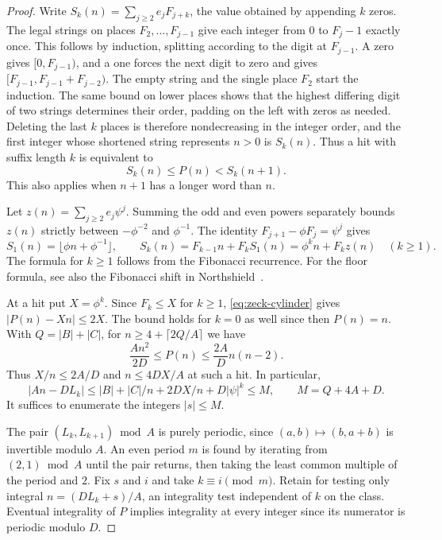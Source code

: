 \documentclass[11pt,reqno,a4paper]{amsart}
\theoremstyle{remark}
\begin{document}
\begin{proof}
Write \(S_k(n)=\sum_{j\ge2}e_j F_{j+k}\), the value obtained by
appending \(k\) zeros. The legal strings on places \(F_2,\ldots,F_{j-1}\)
give each integer from \(0\) to \(F_j-1\) exactly once. This follows
by induction, splitting according to the digit at \(F_{j-1}\).
A zero gives \([0,F_{j-1})\), and a one forces the next digit to
zero and gives \([F_{j-1},F_{j-1}+F_{j-2})\). The empty string and
the single place \(F_2\) start the induction. The same bound on
lower places shows that the highest differing digit of two strings
determines their order, padding on the left with zeros as needed.
Deleting the last \(k\) places is therefore nondecreasing in the
integer order, and the first integer whose shortened string represents
\(n>0\) is \(S_k(n)\). Thus a hit with suffix length \(k\) is equivalent to
\begin{equation}\label{eq:zeck-cylinder}
 S_k(n)\le P(n)<S_k(n+1).
\end{equation}
This also applies when \(n+1\) has a longer word than \(n\).

Let \(z(n)=\sum_{j\ge2}e_j\psi^j\). Summing the odd and even powers
separately bounds \(z(n)\) strictly between \(-\phi^{-2}\) and
\(\phi^{-1}\). The identity \(F_{j+1}-\phi F_j=\psi^j\) gives
\begin{equation}\label{eq:zeck-shift}
 S_1(n)=\lfloor\phi n+\phi^{-1}\rfloor,\qquad
 S_k(n)=F_{k-1}n+F_k S_1(n)=\phi^k n+F_k z(n)
 \quad(k\ge1).
\end{equation}
The formula for \(k\ge1\) follows from the Fibonacci recurrence.
For the floor formula, see also the Fibonacci shift
in Northshield~\cite[\S6]{zec-northshield}.

At a hit put \(X=\phi^k\). Since \(F_k\le X\) for \(k\ge1\),
\eqref{eq:zeck-cylinder} gives \(\lvert P(n)-Xn\rvert\le2X\).
The bound holds for \(k=0\) as well since then \(P(n)=n\).
With \(Q=|B|+|C|\), for \(n\ge 4+\lceil 2Q/A\rceil\) we have
\[
 \frac{A n^2}{2D}\le P(n)\le\frac{2A}{D}n(n-2).
\]
Thus \(X/n\le2A/D\) and \(n\le4DX/A\) at such a hit. In particular,
\[
 |An-DL_k|\le |B|+|C|/n+2DX/n+D|\psi|^k
 \le M,\qquad M=Q+4A+D.
\]
It suffices to enumerate the integers \(|s|\le M\).

The pair \((L_k,L_{k+1})\bmod A\) is purely periodic, since
\((a,b)\mapsto(b,a+b)\) is invertible modulo \(A\). An even period
\(m\) is found by iterating from \((2,1)\bmod A\) until the pair
returns, then taking the least common multiple of the period and \(2\).
Fix \(s\) and \(i\) and take \(k\equiv i\pmod m\). Retain for testing
only integral \(n=(D L_k+s)/A\), an integrality test independent of \(k\)
on the class. Eventual integrality of \(P\) implies integrality at every
integer since its numerator is periodic modulo \(D\).


\end{proof}
\end{document}
